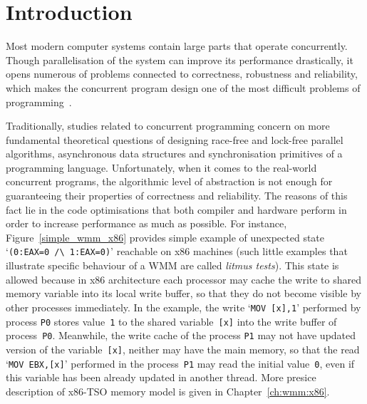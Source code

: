 
\chapter{Introduction}
\label{ch:intro}

Most modern computer systems contain large parts that operate concurrently. Though parallelisation of the system can improve its performance drastically, it opens numerous of problems connected to correctness, robustness and reliability, which makes the concurrent program design one of the most difficult problems of programming~\cite{mckenney2017parallel}.

Traditionally, studies related to concurrent programming concern on more fundamental theoretical questions of designing race-free and lock-free parallel algorithms, asynchronous data structures and synchronisation primitives of a programming language. Unfortunately,
when it comes to 
the real-world concurrent programs, the algorithmic level of abstraction is not enough for guaranteeing their properties of correctness and reliability. The reasons of this fact lie in the code optimisations that both compiler and hardware perform in order to increase performance as much as possible. For instance, Figure~\ref{simple_wmm_x86} provides simple example of
unexpected state `\texttt{(0:EAX=0~/\textbackslash~1:EAX=0)}' reachable on x86 machines (such little examples that illustrate specific behaviour of a WMM are called \textit{litmus tests}).
This state is allowed because in x86 architecture each processor may cache the write to shared memory variable into its local write buffer, so that they do not become visible by other processes immediately. In the example, the write `\texttt{MOV~[x],1}' performed by process \texttt{P0} stores value~\texttt{1} to the shared variable~\texttt{[x]} into the write buffer of process~\texttt{P0}. Meanwhile, the write cache of the process \texttt{P1} may not have updated version of the variable~\texttt{[x]}, neither may have the main memory, so that the read `\texttt{MOV~EBX,[x]}' performed in the process~\texttt{P1} may read the initial value~\texttt{0}, even if this variable has been already updated in another thread. More presice description of x86-TSO memory model is given in Chapter~\ref{ch:wmm:x86}.

